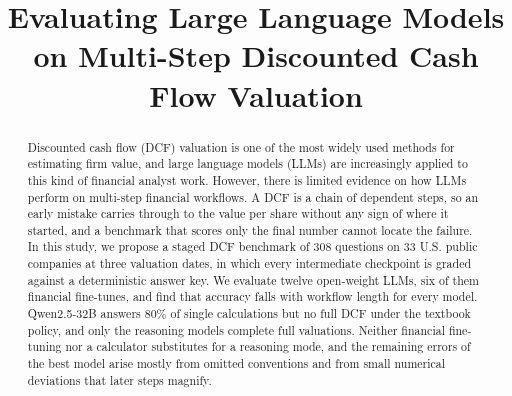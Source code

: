 \documentclass[conference]{IEEEtran}
\begin{document}
\title{Evaluating Large Language Models on Multi-Step Discounted Cash Flow Valuation}

\author{
\and
{}
\and
{}
}

\maketitle

\begin{abstract}
Discounted cash flow (DCF) valuation is one of the most widely used methods for estimating firm value, and large language models (LLMs) are increasingly applied to this kind of financial analyst work. However, there is limited evidence on how LLMs perform on multi-step financial workflows. A DCF is a chain of dependent steps, so an early mistake carries through to the value per share without any sign of where it started, and a benchmark that scores only the final number cannot locate the failure. In this study, we propose a staged DCF benchmark of 308 questions on 33 U.S. public companies at three valuation dates, in which every intermediate checkpoint is graded against a deterministic answer key. We evaluate twelve open-weight LLMs, six of them financial fine-tunes, and find that accuracy falls with workflow length for every model. Qwen2.5-32B answers 80\% of single calculations but no full DCF under the textbook policy, and only the reasoning models complete full valuations. Neither financial fine-tuning nor a calculator substitutes for a reasoning mode, and the remaining errors of the best model arise mostly from omitted conventions and from small numerical deviations that later steps magnify.
\end{abstract}
\end{document}

